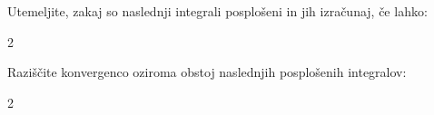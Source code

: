 \documentclass[11pt,a4paper]{exam}
\renewcommand{\{}{\lbrace}
\renewcommand{\}}{\rbrace}
\begin{document}
\begin{questions}
	\question Utemeljite, zakaj so naslednji integrali posplošeni in jih izračunaj, če lahko:
	\begin{multicols}{2}
	\end{multicols}

	\question Raziščite konvergenco oziroma obstoj naslednjih posplošenih integralov:
	\begin{multicols}{2}
		\begin{parts}

\end{parts}
\end{multicols}
\end{questions}
\end{document}
